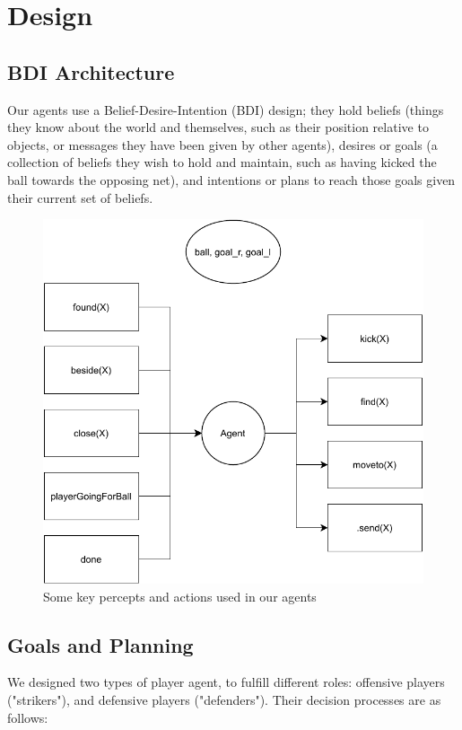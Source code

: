 \documentclass[conference]{IEEEtran}
\begin{document}
	\section{Design}
	
	\subsection{BDI Architecture}
	Our agents use a Belief-Desire-Intention (BDI) design; they hold beliefs (things they know about the world and themselves, such as their position relative to objects, or messages they have been given by other agents), desires or goals (a collection of beliefs they wish to hold and maintain, such as having kicked the ball towards the opposing net), and intentions or plans to reach those goals given their current set of beliefs. 
	\begin{figure}[ht]
		\centering
		\includegraphics[scale=0.5]{fig/percepts-and-actions.pdf}
		\caption{Some key percepts and actions used in our agents}
		\label{percepts-actions}
	\end{figure}
	
	
	\subsection{Goals and Planning}
	
	We designed two types of player agent, to fulfill different roles: offensive players ("strikers"), and defensive players ("defenders"). Their decision processes are as follows:
	
\end{document}
